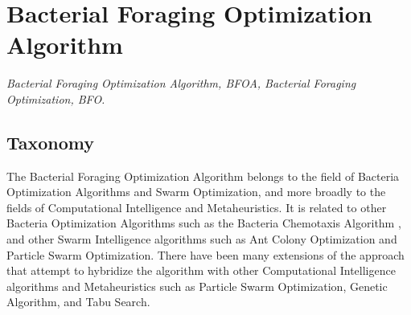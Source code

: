 

\section{Bacterial Foraging Optimization Algorithm} 
\label{sec:bfoa}

\emph{Bacterial Foraging Optimization Algorithm, BFOA, Bacterial Foraging Optimization, BFO.}

\subsection{Taxonomy}
The Bacterial Foraging Optimization Algorithm belongs to the field of Bacteria Optimization Algorithms and Swarm Optimization, and more broadly to the fields of Computational Intelligence and Metaheuristics.
It is related to other Bacteria Optimization Algorithms such as the Bacteria Chemotaxis Algorithm \cite{Muller2002}, and other Swarm Intelligence algorithms such as Ant Colony Optimization and Particle Swarm Optimization.
There have been many extensions of the approach that attempt to hybridize the algorithm with other Computational Intelligence algorithms and Metaheuristics such as Particle Swarm Optimization, Genetic Algorithm, and Tabu Search.


